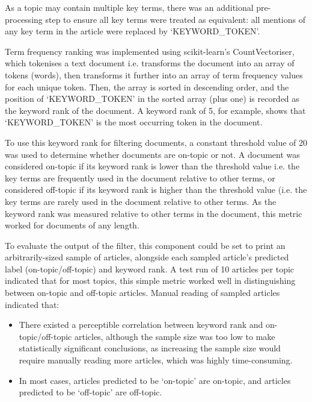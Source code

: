 \documentclass{report}
\begin{document}
As a topic may contain multiple key terms, there was an additional pre-processing step to ensure all key terms were treated as equivalent: all mentions of any key term in the article were replaced by `KEYWORD\_TOKEN'.

Term frequency ranking was implemented using scikit-learn's \cite{Scikit-learn} CountVectoriser, which tokenises a text document i.e. transforms the document into an array of tokens (words), then transforms it further into an array of term frequency values for each unique token.
Then, the array is sorted in descending order, and the position of `KEYWORD\_TOKEN' in the sorted array (plus one) is recorded as the keyword rank of the document.
A keyword rank of 5, for example, shows that `KEYWORD\_TOKEN' is the  most occurring token in the document.

To use this keyword rank for filtering documents, a constant threshold value of 20 was used to determine whether documents are on-topic or not.
A document was considered on-topic if its keyword rank is lower than the threshold value i.e. the key terms are frequently used in the document relative to other terms, or considered off-topic if its keyword rank is higher than the threshold value (i.e. the key terms are rarely used in the document relative to other terms.
As the keyword rank was measured relative to other terms in the document, this metric worked for documents of any length.

To evaluate the output of the filter, this component could be set to print an arbitrarily-sized sample of articles, alongside each sampled article's predicted label (on-topic/off-topic) and keyword rank.
A test run of 10 articles per topic indicated that for most topics, this simple metric worked well in distinguishing between on-topic and off-topic articles.
Manual reading of sampled articles indicated that:
\begin{itemize}
	\item There existed a perceptible correlation between keyword rank and on-topic/off-topic articles, although the sample size was too low to make statistically significant conclusions, as increasing the sample size would require manually reading more articles, which was highly time-consuming.
	\item In most cases, articles predicted to be `on-topic' are on-topic, and articles predicted to be `off-topic' are off-topic.
\end{itemize}
\end{document}
